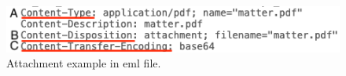 \begin{figure}[H]
    \begin{center}
        \includegraphics[width=12cm]{figs/attachment.png}
        \caption{Attachment example in \ac{eml} file.}
        \label{fig:c2:attachement}
    \end{center}
  \end{figure}
